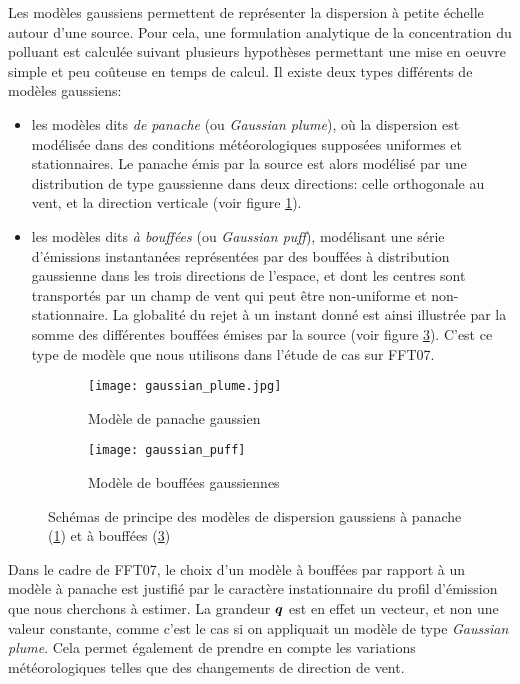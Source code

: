 Les modèles gaussiens permettent de représenter la dispersion à petite échelle autour d'une source. Pour cela, une formulation analytique de la concentration du polluant est calculée suivant plusieurs hypothèses permettant une mise en oeuvre simple et peu coûteuse en temps de calcul. Il existe deux types différents de modèles gaussiens:\\

\begin{itemize}
	\item les modèles dits \textit{de panache} (ou \textit{Gaussian plume}), où la dispersion est modélisée dans des conditions météorologiques supposées uniformes et stationnaires. Le panache émis par la source est alors modélisé par une distribution de type gaussienne dans deux directions: celle orthogonale au vent, et la direction verticale (voir figure \ref{gaussian_plume}).
	\item les modèles dits \textit{à bouffées} (ou \textit{Gaussian puff}), modélisant une série d'émissions instantanées représentées par des bouffées à distribution gaussienne dans les trois directions de l'espace, et dont les centres sont transportés par un champ de vent qui peut  être non-uniforme et non-stationnaire. La globalité du rejet à un instant donné est ainsi illustrée par la somme des différentes bouffées émises par la source (voir figure \ref{gaussian_puff}). C'est ce type de modèle que nous utilisons dans l'étude de cas sur FFT07.
\end{itemize}

 \begin{figure}[h!]
 	\label{fig_gaussian_models}	
 	\centering
 	\begin{subfigure}[t]{0.5\textwidth}
 		\centering
 		\texttt{[image: gaussian\_plume.jpg]}
 		\caption{Modèle de panache gaussien \cite{Schulze1996}}
 		\label{gaussian_plume}
 	\end{subfigure}%
 	\begin{subfigure}[t]{0.5\textwidth}
 		\centering
 		\texttt{[image: gaussian\_puff]}
 		\caption{Modèle de bouffées gaussiennes}
 		\label{gaussian_puff}
 	\end{subfigure}
 	
 	\caption{Schémas de principe des modèles de dispersion gaussiens à panache (\ref{gaussian_plume}) et à bouffées (\ref{gaussian_puff})}
 \end{figure}
 
 Dans le cadre de FFT07, le choix d'un modèle à bouffées par rapport à un modèle à panache est justifié par {le caractère instationnaire} du profil d'émission que nous cherchons à estimer. La grandeur ${\bm{q}}$ est en effet un vecteur, et non une valeur constante, comme c'est le cas si on appliquait un modèle de type \textit{Gaussian plume}. Cela permet également de prendre en compte les variations météorologiques telles que des changements de direction de vent. \\
 
